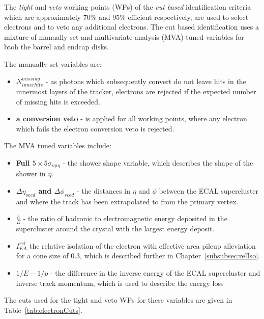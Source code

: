 The \emph{tight} and \emph{veto} working points (WPs) of the \emph{cut based} identification criteria which are approximately  70\% and 95\% efficient respectively, are used to select electrons and to veto any additional electrons.
The cut based identification uses a mixture of manually set and multivariate analysis (MVA) tuned variables for btoh the barrel and endcap disks.

The manually set variables are:
\begin{itemize}
\item \textbf{$N^{missing}_{inner hits}$} - as photons which subsequently convert do not leave hits in the innermost layers of the tracker, electrons are rejected if the expected number of missing hits is exceeded.
\item \textbf{a conversion veto} - is applied for all working points, where any electron which fails the electron conversion veto is rejected.
\end{itemize}

The MVA tuned variables include:
\begin{itemize}
\item \textbf{Full $5 \times 5 \sigma_{i\eta i\eta}$} - the shower shape variable, which describes the shape of the shower in $\eta$.
\item \textbf{$\Delta \eta_{seed}$ and $\Delta \phi_{seed}$} - the distances in $\eta$ and $\phi$ between the ECAL supercluster and where the track has been extrapolated to from the primary vertex.
\item \textbf{$\frac{h}{E}$} - the ratio of hadronic to electromagnetic energy deposited in the supercluster around the crystal with the largest energy deposit.
\item \textbf{$I^{rel}_{EA}$} the relative isolation of the electron with effective area pileup alleviation for a cone size of 0.3, which is described further in Chapter~\ref{subsubsec:relIso}.
\item \textbf{$1/E - 1/p$} - the difference in the inverse energy of the ECAL supercluster and inverse track momentum, which is used to describe the energy loss 
\end{itemize}

The cuts used for the tight and veto WPs for these variables are given in Table~\ref{tab:electronCuts}.

